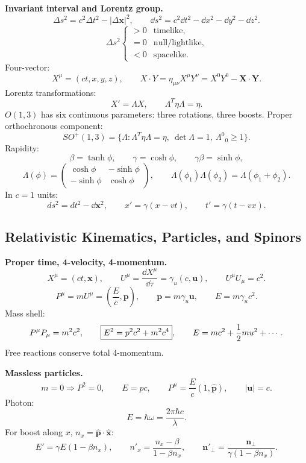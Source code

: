 \noindent\textbf{Invariant interval and Lorentz group.}\quad
\[
  \boxed{\Delta s^2=c^2\Delta t^2-|\Delta\mathbf x|^2},\qquad
  \dd s^2=c^2\dd t^2-\dd x^2-\dd y^2-\dd z^2.
\]
\[
\Delta s^2
\begin{cases}
>0 & \text{timelike},\\
=0 & \text{null/lightlike},\\
<0 & \text{spacelike}.
\end{cases}
\]
Four-vector:
\[
  X^\mu=(ct,x,y,z),\qquad
  X\cdot Y=\eta_{\mu\nu}X^\mu Y^\nu=X^0Y^0-\mathbf X\cdot\mathbf Y.
\]
Lorentz transformations:
\[
  X'=\Lambda X,\qquad
  \boxed{\Lambda^T\eta\Lambda=\eta}.
\]
$O(1,3)$ has six continuous parameters: three rotations, three boosts. Proper
orthochronous component:
\[
  SO^+(1,3)=\{\Lambda:\Lambda^T\eta\Lambda=\eta,\ \det\Lambda=1,\ \Lambda^0{}_0\ge1\}.
\]
Rapidity:
\[
  \beta=\tanh\phi,\qquad \gamma=\cosh\phi,\qquad \gamma\beta=\sinh\phi,
\]
\[
  \Lambda(\phi)=
  \begin{pmatrix}\cosh\phi&-\sinh\phi\\-\sinh\phi&\cosh\phi\end{pmatrix},
  \qquad
  \Lambda(\phi_1)\Lambda(\phi_2)=\Lambda(\phi_1+\phi_2).
\]
In $c=1$ units:
\[
  ds^2=dt^2-\dd\mathbf x^2,\qquad
  x'=\gamma(x-vt),\qquad t'=\gamma(t-vx).
\]

\subsection{Relativistic Kinematics, Particles, and Spinors}

\noindent\textbf{Proper time, 4-velocity, 4-momentum.}\quad
\[
  X^\mu=(ct,\mathbf x),\qquad
  U^\mu=\frac{\dd X^\mu}{\dd\tau}=\gamma_u(c,\mathbf u),\qquad
  U^\mu U_\mu=c^2.
\]
\[
  P^\mu=mU^\mu=\left(\frac{E}{c},\mathbf p\right),\qquad
  \mathbf p=m\gamma_u\mathbf u,\qquad
  E=m\gamma_uc^2.
\]
Mass shell:
\[
  P^\mu P_\mu=m^2c^2,\qquad
  \boxed{E^2=p^2c^2+m^2c^4},\qquad
  E=mc^2+\frac{1}{2} mu^2+\cdots.
\]
Free reactions conserve total 4-momentum. 

\noindent\textbf{Massless particles.}\quad
\[
  m=0\Rightarrow P^2=0,\qquad
  E=pc,\qquad
  P^\mu=\frac{E}{c}(1,\hat{\mathbf p}),\qquad |\mathbf u|=c.
\]
Photon:
\[
  E=\hbar\omega=\frac{2\pi\hbar c}{\lambda}.
\]
For boost along $x$, $n_x=\hat{\mathbf p}\cdot\hat{\mathbf x}$:
\[
  E'=\gamma E(1-\beta n_x),\qquad
  n'_x=\frac{n_x-\beta}{1-\beta n_x},\qquad
  \mathbf n'_\perp=\frac{\mathbf n_\perp}{\gamma(1-\beta n_x)}.
\]

